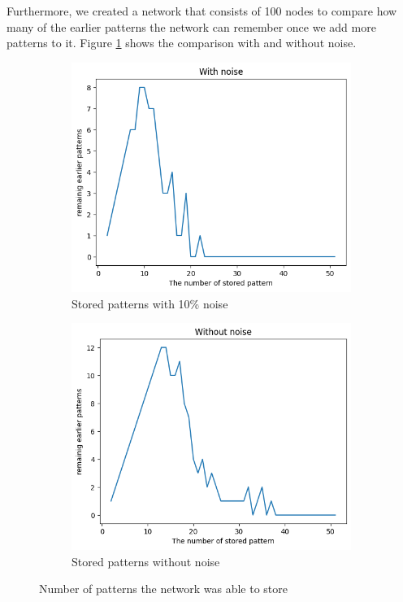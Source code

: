 \documentclass[a4paper]{article}
\begin{document}
Furthermore, we created a network that consists of 100 nodes to compare how many of the earlier patterns the network can remember once we add more patterns to it. Figure \ref{fig:earlier-patterns}  shows the comparison with and without noise.   



\begin{figure}[ht]
    \centering
    \begin{subfigure}[b]{0.48\textwidth}
        \includegraphics[width=\textwidth]{Labs/Lab 3/Hasan_3/Result_fig/noise.png}
        \caption{Stored patterns with 10\% noise}
    \end{subfigure}
    \hfill
    \begin{subfigure}[b]{0.48\textwidth}
        \includegraphics[width=\textwidth]{Labs/Lab 3/Hasan_3/Result_fig/without-noise.png}
        \caption{Stored patterns without noise}
    \end{subfigure}
    \caption{Number of patterns the network was able to store}
    \label{fig:earlier-patterns}
\end{figure}
\end{document}
